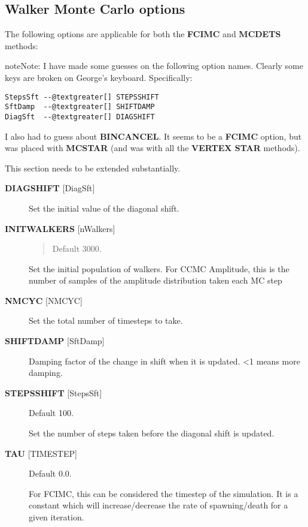 \documentclass[openany,a4paper,10pt,english]{manual}
\begin{document}
\subsection{Walker Monte Carlo options}

The following options are applicable for both the \textbf{FCIMC} and \textbf{MCDETS} methods:

\begin{notice}{note}{Note:}
I have made some guesses on the following option names.  Clearly some keys are broken
on George's keyboard.  Specifically:

\begin{Verbatim}[commandchars=@\[\]]
StepsSft --@textgreater[] STEPSSHIFT
SftDamp  --@textgreater[] SHIFTDAMP
DiagSft  --@textgreater[] DIAGSHIFT
\end{Verbatim}

I also had to guess about \textbf{BINCANCEL}.  It seems to be a \textbf{FCIMC}
option, but was placed with \textbf{MCSTAR} (and was with all the \textbf{VERTEX STAR}
methods).

This section needs to be extended substantially.
\end{notice}
\begin{description}
\item[\textbf{DIAGSHIFT} {[}DiagSft{]}] \leavevmode
Set the initial value of the diagonal shift.

\item[\textbf{INITWALKERS} {[}nWalkers{]}] \leavevmode\begin{quote}

Default 3000.
\end{quote}

Set the initial population of walkers.
For CCMC Amplitude, this is the number of samples of the amplitude distribution taken each MC step

\item[\textbf{NMCYC} {[}NMCYC{]}] \leavevmode
Set the total number of timesteps to take.

\item[\textbf{SHIFTDAMP}  {[}SftDamp{]}] \leavevmode
Damping factor of the change in shift when it is updated.  \textless{}1 means more damping.

\item[\textbf{STEPSSHIFT} {[}StepsSft{]}] \leavevmode
Default 100.

Set the number of steps taken before the diagonal shift is updated.

\item[\textbf{TAU} {[}TIMESTEP{]}] \leavevmode
Default 0.0.

For FCIMC, this can be considered the timestep of the simulation. It is a constant which
will increase/decrease the rate of spawning/death for a given iteration.

\end{description}
\end{document}
